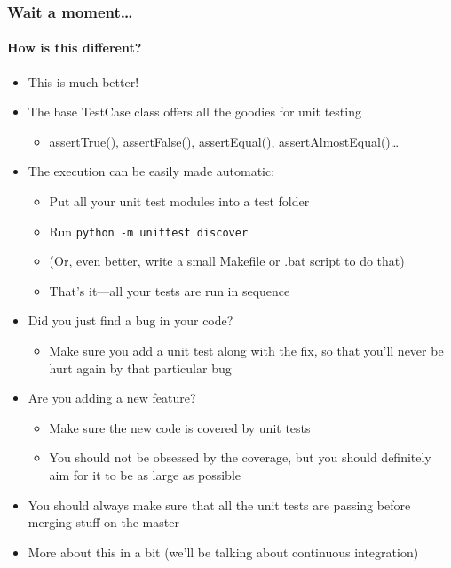 \documentclass[9pt]{beamer}
\begin{document}
\begin{frame}
  \frametitle{Wait a moment\ldots}
  \framesubtitle{How is this different?}
  \begin{itemize}
  \item This is much better!
  \item The base TestCase class offers all the goodies for unit testing
    \begin{itemize}
    \item assertTrue(), assertFalse(), assertEqual(), assertAlmostEqual()\ldots
    \end{itemize}
  \item The execution can be easily made automatic:
    \begin{itemize}
    \item Put all your unit test modules into a test folder
    \item Run \texttt{python -m unittest discover}
    \item (Or, even better, write a small Makefile or .bat script to do that)
    \item That's it---all your tests are run in sequence
    \end{itemize}
  \item Did you just find a bug in your code?
    \begin{itemize}
    \item Make sure you add a unit test along with the fix, so that you'll
      never be hurt again by that particular bug
    \end{itemize}
  \item Are you adding a new feature?
    \begin{itemize}
    \item Make sure the new code is covered by unit tests
    \item You should not be obsessed by the coverage, but you should
      definitely aim for it to be as large as possible
    \end{itemize}
  \item \alert{You should always make sure that all the unit tests are
    passing before merging stuff on the master}    
  \item More about this in a bit (we'll be talking about continuous integration)
  \end{itemize}
\end{frame}
\end{document}
